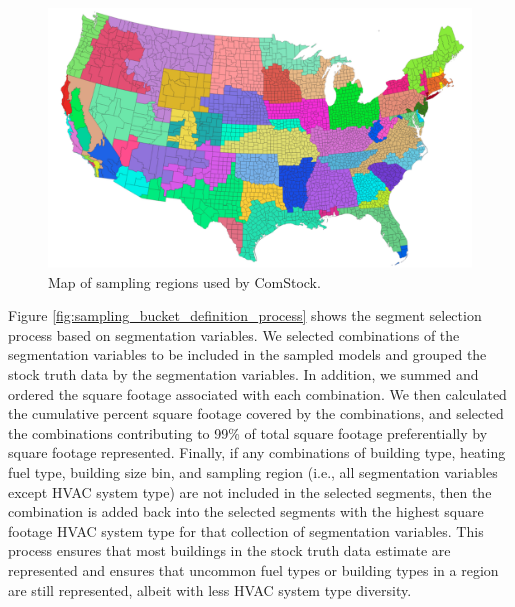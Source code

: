 \begin{figure}[hbt!]
  \centering \includegraphics[width=1\textwidth]{figures/sampling_regions.png}
  \caption{Map of sampling regions used by ComStock.}
   \label{fig:sampling_regions}
\end{figure}

Figure \ref{fig:sampling_bucket_definition_process} shows the segment selection process based on segmentation variables. We selected combinations of the segmentation variables to be included in the sampled models and grouped the stock truth data by the segmentation variables. In addition, we summed and ordered the square footage associated with each combination. We then calculated the cumulative percent square footage covered by the combinations, and selected the combinations contributing to 99\% of total square footage preferentially by square footage represented. Finally, if any combinations of building type, heating fuel type, building size bin, and sampling region (i.e., all segmentation variables except HVAC system type) are not included in the selected segments, then the combination is added back into the selected segments with the highest square footage HVAC system type for that collection of segmentation variables. This process ensures that most buildings in the stock truth data estimate are represented and ensures that uncommon fuel types or building types in a region are still represented, albeit with less HVAC system type diversity.

